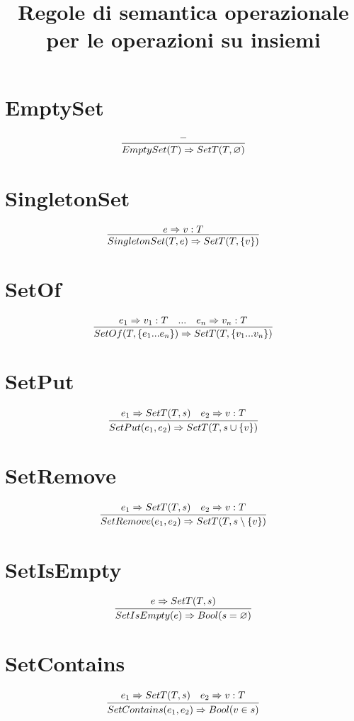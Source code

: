 \documentclass{article}
\title{Regole di semantica operazionale per le operazioni su insiemi}
\date{}
\begin{document}
\maketitle
{}
\section*{EmptySet}
\begin{equation*}
	\infer{EmptySet(T) \Rightarrow SetT(T, \varnothing)}{-}
\end{equation*}
\section*{SingletonSet}
\begin{equation*}
	\infer{SingletonSet(T, e) \Rightarrow SetT(T, \{v\})}{e \Rightarrow v:T}
\end{equation*}
\section*{SetOf}
\begin{equation*}
	\infer{SetOf(T, \{e_1...e_n\}) \Rightarrow SetT(T, \{v_1...v_n\})}{e_1 \Rightarrow v_1:T & ... & e_n \Rightarrow v_n:T}
\end{equation*}
\section*{SetPut}
\begin{equation*}
	\infer{SetPut(e_1, e_2) \Rightarrow SetT(T, s \cup \{v\})}{e_1 \Rightarrow SetT(T, s) & e_2 \Rightarrow v:T}
\end{equation*}
\section*{SetRemove}
\begin{equation*}
	\infer{SetRemove(e_1, e_2) \Rightarrow SetT(T, s \setminus \{v\})}{e_1 \Rightarrow SetT(T, s) & e_2 \Rightarrow v:T}
\end{equation*}
\section*{SetIsEmpty}
\begin{equation*}
	\infer{SetIsEmpty(e) \Rightarrow Bool(s = \varnothing)}{e \Rightarrow SetT(T, s)}
\end{equation*}
\section*{SetContains}
\begin{equation*}
	\infer{SetContains(e_1, e_2) \Rightarrow Bool(v \in s)}{e_1 \Rightarrow SetT(T, s) & e_2 \Rightarrow v:T}
\end{equation*}
\end{document}
